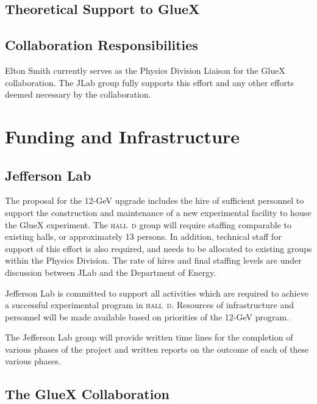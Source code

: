 \documentclass[oneside,12pt,letterpaper]{article}
\newcommand{\hd}{\mbox{\textsc{hall d}}}
\newcommand{\gx}{\mbox{GlueX}}
\newcommand{\instname}{Jefferson Lab}
\newcommand{\instabbr}{JLab}
\begin{document}
\subsection{Theoretical Support to \gx{}}
%
%
\subsection{Collaboration Responsibilities}
% 
%
Elton Smith currently serves as the Physics Division Liaison for the \gx{}
collaboration. The \instabbr{} group fully supports this effort and
any other efforts deemed necessary by the collaboration. 
%
\section{Funding and Infrastructure}
\subsection{\instname{}}

The proposal for the 12-GeV upgrade includes the hire of sufficient personnel
to support the construction and maintenance of a new experimental facility
to house the GlueX experiment. The \hd{} group will require 
staffing comparable to existing halls, or approximately 13 persons. In addition,
technical staff for support of this effort is also required, and needs to be
allocated to existing groups within the Physics Division. The
rate of hires and final staffing levels are under discussion between JLab
and the Department of Energy.

\instname{} is committed to support all activities which are required to achieve
a successful experimental program in \hd{}. Resources of infrastructure and
personnel will be made available based on priorities of the 12-GeV program. 

The \instname{} group will provide written time lines for the completion of
various phases of the project and written reports on the outcome of each
of these various phases.

\subsection{The \gx{} Collaboration}
\end{document}

